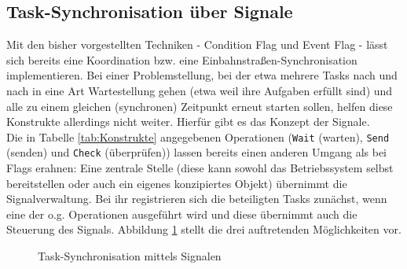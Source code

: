 \documentclass{llncs}
\begin{document}
\subsection{Task-Synchronisation über Signale}
\label{subsec:Task_Synchronisation_Signale}
Mit den bisher vorgestellten Techniken - Condition Flag und Event Flag - lässt sich bereits eine Koordination bzw. eine Einbahnstraßen-Synchronisation implementieren. Bei einer Problemstellung, bei der etwa mehrere Tasks nach und nach in eine Art Wartestellung gehen (etwa weil ihre Aufgaben erfüllt sind) und alle zu einem gleichen (synchronen) Zeitpunkt erneut starten sollen, helfen diese Konstrukte allerdings nicht weiter. Hierfür gibt es das Konzept der Signale.\\

Die in Tabelle \ref{tab:Konstrukte} angegebenen Operationen (\texttt{Wait} (warten), \texttt{Send} (senden) und \texttt{Check} (überprüfen)) lassen bereits einen anderen Umgang als bei Flags erahnen: Eine zentrale Stelle (diese kann sowohl das Betriebssystem selbst bereitstellen oder auch ein eigenes konzipiertes Objekt) übernimmt die Signalverwaltung. Bei ihr registrieren sich die beteiligten Tasks zunächst, wenn eine der o.g. Operationen ausgeführt wird und diese übernimmt auch die Steuerung des Signals. Abbildung \ref{fig:Signale_gesamt} stellt die drei auftretenden Möglichkeiten vor.

\begin{figure}[h]
	\centering
	\begin{subfigure}{.40\columnwidth} %
		\def\svgwidth{\columnwidth}
		
	\end{subfigure}
	\caption{\label{fig:Signale_gesamt}Task-Synchronisation mittels Signalen \autocite[vgl.][90]{Cooling2017}}
\end{figure}
\end{document}
